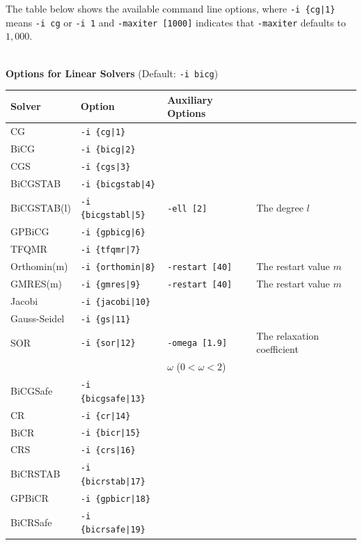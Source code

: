 \documentclass[a4paper]{article}
\begin{document}
The table below shows the available command line options, 
where \verb=-i {cg|1}= means \verb=-i cg= or \verb=-i 1= and \verb=-maxiter [1000]= indicates that \verb=-maxiter= defaults to $1,000$.
\\
\\
\begin{minipage}[t]{\textwidth}
\begin{center}
{\bf Options for Linear Solvers} (Default: \verb=-i bicg=) \\
\begin{tabular}{l|lll}\hline\hline
 Solver      & Option              &  Auxiliary Options  & \\ \hline
 CG          & \verb=-i {cg|1}=         &    \\ 
 BiCG        & \verb=-i {bicg|2}=       &    \\
 CGS         & \verb=-i {cgs|3}=        &    \\
 BiCGSTAB    & \verb=-i {bicgstab|4}=   &    \\
 BiCGSTAB(l) & \verb=-i {bicgstabl|5}=  & \verb=-ell [2]=      & The degree $l$ \\
 GPBiCG      & \verb=-i {gpbicg|6}=     &    \\
 TFQMR       & \verb=-i {tfqmr|7}=      &    \\
 Orthomin(m) & \verb=-i {orthomin|8}=   & \verb=-restart [40]= & The restart
 value $m$  \\
 GMRES(m)    & \verb=-i {gmres|9}=      & \verb=-restart [40]= & The restart value $m$  \\ 
 Jacobi      & \verb=-i {jacobi|10}=    &    \\
 Gauss-Seidel& \verb=-i {gs|11}=        &    \\
 SOR         & \verb=-i {sor|12}=       & \verb=-omega [1.9]=  & The relaxation coefficient \\
             &                          & $\omega$ ($0<\omega<2$) \\
 BiCGSafe    & \verb=-i {bicgsafe|13}=     &    \\
 CR          & \verb=-i {cr|14}=        &    \\ 
 BiCR        & \verb=-i {bicr|15}=      &    \\
 CRS         & \verb=-i {crs|16}=       &    \\
 BiCRSTAB    & \verb=-i {bicrstab|17}=  &    \\
 GPBiCR      & \verb=-i {gpbicr|18}=    &    \\
 BiCRSafe    & \verb=-i {bicrsafe|19}=  &    \\

\end{tabular}
\end{center}
\end{minipage}
\end{document}
